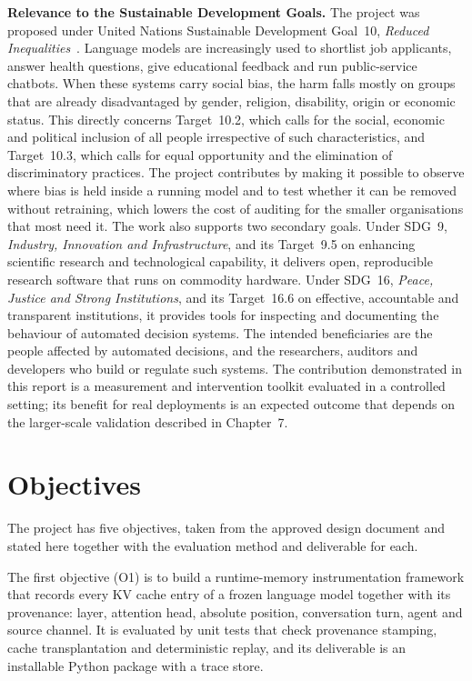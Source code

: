 \textbf{Relevance to the Sustainable Development Goals.} The project was proposed under United Nations Sustainable Development Goal~10, \emph{Reduced Inequalities}~\cite{un2015agenda}. Language models are increasingly used to shortlist job applicants, answer health questions, give educational feedback and run public-service chatbots. When these systems carry social bias, the harm falls mostly on groups that are already disadvantaged by gender, religion, disability, origin or economic status. This directly concerns Target~10.2, which calls for the social, economic and political inclusion of all people irrespective of such characteristics, and Target~10.3, which calls for equal opportunity and the elimination of discriminatory practices. The project contributes by making it possible to observe where bias is held inside a running model and to test whether it can be removed without retraining, which lowers the cost of auditing for the smaller organisations that most need it. The work also supports two secondary goals. Under SDG~9, \emph{Industry, Innovation and Infrastructure}, and its Target~9.5 on enhancing scientific research and technological capability, it delivers open, reproducible research software that runs on commodity hardware. Under SDG~16, \emph{Peace, Justice and Strong Institutions}, and its Target~16.6 on effective, accountable and transparent institutions, it provides tools for inspecting and documenting the behaviour of automated decision systems. The intended beneficiaries are the people affected by automated decisions, and the researchers, auditors and developers who build or regulate such systems. The contribution demonstrated in this report is a measurement and intervention toolkit evaluated in a controlled setting; its benefit for real deployments is an expected outcome that depends on the larger-scale validation described in Chapter~7.

\section{Objectives}
The project has five objectives, taken from the approved design document and stated here together with the evaluation method and deliverable for each.

The first objective (O1) is to build a runtime-memory instrumentation framework that records every KV cache entry of a frozen language model together with its provenance: layer, attention head, absolute position, conversation turn, agent and source channel. It is evaluated by unit tests that check provenance stamping, cache transplantation and deterministic replay, and its deliverable is an installable Python package with a trace store.

